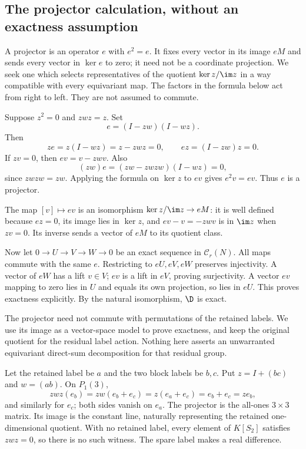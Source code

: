 \subsection{The projector calculation, without an exactness assumption}
A projector is an operator $e$ with $e^2=e$. It fixes every vector
in its image $eM$ and sends every vector in $\ker e$ to zero;
it need not be a coordinate projection.
We seek one which selects representatives
of the quotient $\ker z/\im z$ in a way compatible with every
equivariant map. The factors in the formula below act from right
to left. They are not assumed to commute.

Suppose $z^2=0$ and $zwz=z$. Set
\[e=(I-zw)(I-wz).\]
Then
\[ze=z(I-wz)=z-zwz=0,\qquad ez=(I-zw)z=0.\]
If $zv=0$, then $ev=v-zwv$. Also
\[(zw)e=(zw-zwzw)(I-wz)=0,\]
since $zwzw=zw$. Applying the formula on $\ker z$ to $ev$ gives $e^2v=ev$. Thus $e$ is a projector.

The map $[v]\mapsto ev$ is an isomorphism $\ker z/\im z\to eM$: it is well defined because $ez=0$, its image lies in $\ker z$, and $ev-v=-zwv$ is in $\im z$ when $zv=0$. Its inverse sends a vector of $eM$ to its quotient class.

Now let $0\to U\to V\to W\to0$ be an exact sequence in $\mathcal C_r(N)$. All maps commute with the same $e$. Restricting to $eU,eV,eW$ preserves injectivity. A vector of $eW$ has a lift $v\in V$; $ev$ is a lift in $eV$, proving surjectivity. A vector $ev$ mapping to zero lies in $U$ and equals its own projection, so lies in $eU$. This proves exactness explicitly. By the natural isomorphism, $\D$ is exact.

The projector need not commute with permutations of the retained labels. We use its image as a vector-space model to prove exactness, and keep the original quotient for the residual label action. Nothing here asserts an unwarranted equivariant direct-sum decomposition for that residual group.

\begin{example}
Let the retained label be $a$ and the two block labels be $b,c$. Put $z=I+(bc)$ and $w=(ab)$. On $P_1(3)$,
\[zwz(e_b)=zw(e_b+e_c)=z(e_a+e_c)=e_b+e_c=ze_b,\]
and similarly for $e_c$; both sides vanish on $e_a$. The projector is the all-ones $3\times3$ matrix. Its image is the constant line, naturally representing the retained one-dimensional quotient. With no retained label, every element of $K[S_2]$ satisfies $zwz=0$, so there is no such witness. The spare label makes a real difference.
\end{example}



